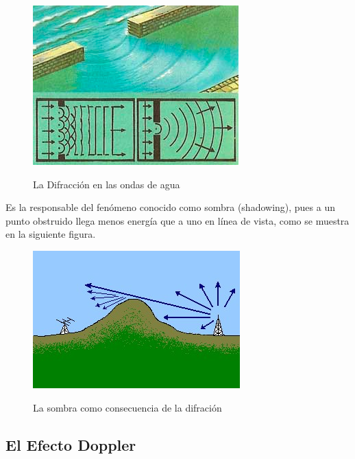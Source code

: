 \begin{figure}[h!]
	\captionsetup{justification = raggedright, singlelinecheck = false}
	\caption{La Difracción en las ondas de agua} 
	\centering
	\includegraphics[scale=1]{Imagenes/Rio.png}
	\label{fig:Rio}
\end{figure}

Es la responsable del fenómeno conocido como sombra (shadowing), pues a un punto obstruido llega menos energía que a uno en línea de vista, como se muestra en la siguiente figura.

\begin{figure}[h!]
	\captionsetup{justification = raggedright, singlelinecheck = false}
	\caption{La sombra como consecuencia de la difración} 
	\centering
	\includegraphics[scale=1]{Imagenes/Valle.png}
	\label{fig:Valle}
\end{figure}

\subsection{El Efecto Doppler}

